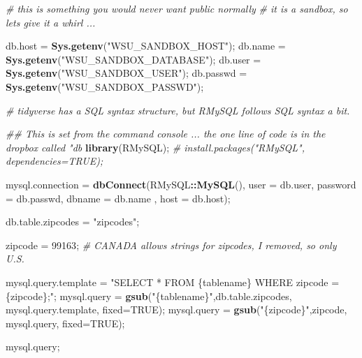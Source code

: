 \documentclass[
]{article}
\newenvironment{Shaded}{\begin{snugshade}}{\end{snugshade}}
\newcommand{\CommentTok}[1]{\textcolor[rgb]{0.56,0.35,0.01}{\textit{#1}}}
\newcommand{\DataTypeTok}[1]{\textcolor[rgb]{0.13,0.29,0.53}{#1}}
\newcommand{\KeywordTok}[1]{\textcolor[rgb]{0.13,0.29,0.53}{\textbf{#1}}}
\newcommand{\NormalTok}[1]{#1}
\newcommand{\OperatorTok}[1]{\textcolor[rgb]{0.81,0.36,0.00}{\textbf{#1}}}
\newcommand{\OtherTok}[1]{\textcolor[rgb]{0.56,0.35,0.01}{#1}}
\newcommand{\StringTok}[1]{\textcolor[rgb]{0.31,0.60,0.02}{#1}}
\begin{document}
\begin{Shaded}
\begin{Highlighting}[]
\CommentTok{\# this is something you would never want public normally}
\CommentTok{\# it is a sandbox, so let\textquotesingle{}s give it a whirl ...}


\NormalTok{db.host   =}\StringTok{ }\KeywordTok{Sys.getenv}\NormalTok{(}\StringTok{"WSU\_SANDBOX\_HOST"}\NormalTok{);}
\NormalTok{db.name   =}\StringTok{ }\KeywordTok{Sys.getenv}\NormalTok{(}\StringTok{"WSU\_SANDBOX\_DATABASE"}\NormalTok{);}
\NormalTok{db.user   =}\StringTok{ }\KeywordTok{Sys.getenv}\NormalTok{(}\StringTok{"WSU\_SANDBOX\_USER"}\NormalTok{);}
\NormalTok{db.passwd =}\StringTok{ }\KeywordTok{Sys.getenv}\NormalTok{(}\StringTok{"WSU\_SANDBOX\_PASSWD"}\NormalTok{);}

\CommentTok{\# tidyverse has a SQL syntax structure, but RMySQL follows SQL syntax a bit.}


\CommentTok{\#\# This is set from the command console ... the one line of code is in the dropbox called "db}
\KeywordTok{library}\NormalTok{(RMySQL); }\CommentTok{\# install.packages("RMySQL", dependencies=TRUE);}

\NormalTok{mysql.connection =}\StringTok{ }\KeywordTok{dbConnect}\NormalTok{(RMySQL}\OperatorTok{::}\KeywordTok{MySQL}\NormalTok{(),}
                            \DataTypeTok{user =}\NormalTok{ db.user,}
                            \DataTypeTok{password =}\NormalTok{ db.passwd,}
                            \DataTypeTok{dbname =}\NormalTok{ db.name ,}
                            \DataTypeTok{host =}\NormalTok{ db.host);}


\NormalTok{db.table.zipcodes =}\StringTok{ "zipcodes"}\NormalTok{;}

\NormalTok{zipcode =}\StringTok{ \textquotesingle{}99163\textquotesingle{}}\NormalTok{;  }\CommentTok{\# CANADA allows strings for zipcodes, I removed, so only U.S.}

\NormalTok{mysql.query.template =}\StringTok{ "SELECT * FROM \{tablename\} WHERE zipcode = \textquotesingle{}\{zipcode\}\textquotesingle{};"}\NormalTok{;}
\NormalTok{mysql.query =}\StringTok{ }\KeywordTok{gsub}\NormalTok{(}\StringTok{"\{tablename\}"}\NormalTok{,db.table.zipcodes, mysql.query.template, }\DataTypeTok{fixed=}\OtherTok{TRUE}\NormalTok{);}
\NormalTok{mysql.query =}\StringTok{ }\KeywordTok{gsub}\NormalTok{(}\StringTok{"\{zipcode\}"}\NormalTok{,zipcode, mysql.query, }\DataTypeTok{fixed=}\OtherTok{TRUE}\NormalTok{);}

\NormalTok{mysql.query;}
\end{Highlighting}
\end{Shaded}
\end{document}
